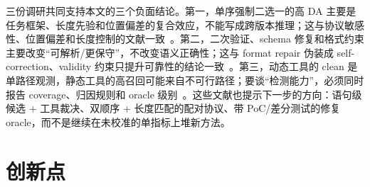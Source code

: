 \documentclass[conference]{IEEEtran}
\begin{document}
三份调研共同支持本文的三个负面结论。第一，单序强制二选一的高 DA 主要是任务框架、长度先验和位置偏差的复合效应，不能写成跨版本推理；这与协议敏感性、位置偏差和长度控制的文献一致~\cite{cichon2026protocol,li2026positionbias}。第二，二次验证、schema 修复和格式约束主要改变“可解析/更保守”，不改变语义正确性；这与 format repair 伪装成 self-correction、validity 约束只提升可靠性的结论一致~\cite{chen2026calibrationfloor,nguyen2026constrained}。第三，动态工具的 clean 是单路径观测，静态工具的高召回可能来自不可行路径；要谈“检测能力”，必须同时报告 coverage、归因规则和 oracle 级别~\cite{huang2026memhint,liang2025leakguard}。这些文献也提示下一步的方向：语句级候选 + 工具裁决、双顺序 + 长度匹配的配对协议、带 PoC/差分测试的修复 oracle，而不是继续在未校准的单指标上堆新方法。

\section{创新点}
\label{sec:innovation}
\end{document}
